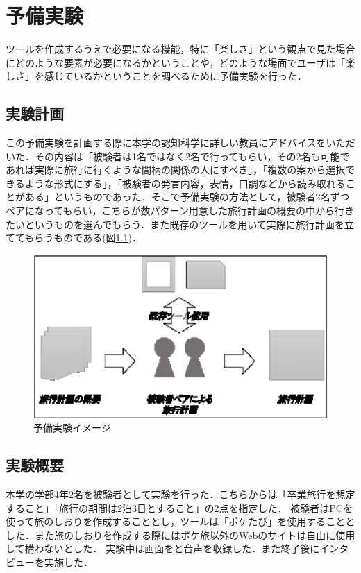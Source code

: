 \documentclass{funthesis}
\begin{document}
\chapter{予備実験}%
ツールを作成するうえで必要になる機能，特に「楽しさ」という観点で見た場合にどのような要素が必要になるかということや，どのような場面でユーザは「楽しさ」を感じているかということを調べるために予備実験を行った．

\section{実験計画}
この予備実験を計画する際に本学の認知科学に詳しい教員にアドバイスをいただいた．その内容は「被験者は1名ではなく2名で行ってもらい，その2名も可能であれば実際に旅行に行くような間柄の関係の人にすべき」，「複数の案から選択できるような形式にする」，「被験者の発言内容，表情，口調などから読み取れることがある」というものであった．そこで予備実験の方法として，被験者2名ずつペアになってもらい，こちらが数パターン用意した旅行計画の概要の中から行きたいというものを選んでもらう．また既存のツールを用いて実際に旅行計画を立ててもらうものである(図\ref{Lsemiexp})．
\begin{figure}[htpb]
\begin{center}
\includegraphics[scale=0.4]{semiexp.eps}
\end{center}
\caption{予備実験イメージ}
\label{Lsemiexp}
\end{figure}


\section{実験概要}
本学の学部4年2名を被験者として実験を行った．こちらからは「卒業旅行を想定すること」「旅行の期間は2泊3日とすること」の2点を指定した．
被験者はPCを使って旅のしおりを作成することとし，ツールは「ポケたび」を使用することとした．また旅のしおりを作成する際にはポケ旅以外のWebのサイトは自由に使用して構わないとした．
実験中は画面をと音声を収録した．また終了後にインタビューを実施した．
\end{document}
